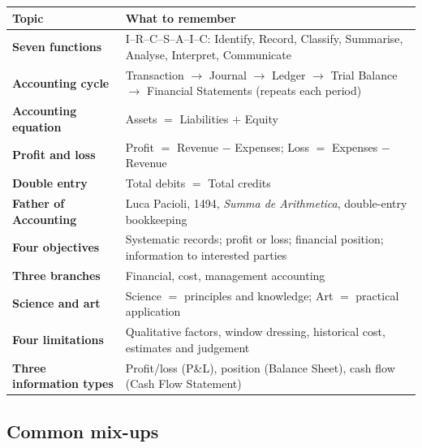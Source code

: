\documentclass[11pt,a4paper]{article}
\begin{document}
\begin{center}
\small
\begin{tabularx}{\textwidth}{@{}l Y@{}}
\toprule
{}\textbf{Topic} & \textbf{What to remember}\\
\midrule
\textbf{Seven functions} & I--R--C--S--A--I--C: Identify, Record, Classify, Summarise, Analyse, Interpret, Communicate\\
\textbf{Accounting cycle} & Transaction $\rightarrow$ Journal $\rightarrow$ Ledger $\rightarrow$ Trial Balance $\rightarrow$ Financial Statements (repeats each period)\\
\textbf{Accounting equation} & Assets $=$ Liabilities $+$ Equity\\
\textbf{Profit and loss} & Profit $=$ Revenue $-$ Expenses; Loss $=$ Expenses $-$ Revenue\\
\textbf{Double entry} & Total debits $=$ Total credits\\
\textbf{Father of Accounting} & Luca Pacioli, 1494, \emph{Summa de Arithmetica}, double-entry bookkeeping\\
\textbf{Four objectives} & Systematic records; profit or loss; financial position; information to interested parties\\
\textbf{Three branches} & Financial, cost, management accounting\\
\textbf{Science and art} & Science $=$ principles and knowledge; Art $=$ practical application\\
\textbf{Four limitations} & Qualitative factors, window dressing, historical cost, estimates and judgement\\
\textbf{Three information types} & Profit/loss (P\&L), position (Balance Sheet), cash flow (Cash Flow Statement)\\
\bottomrule
\end{tabularx}
\end{center}

\subsection{Common mix-ups}
\end{document}
